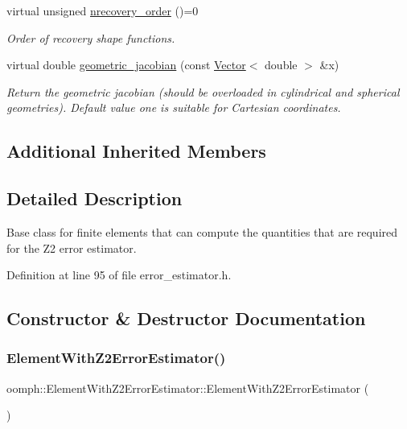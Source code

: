 \begin{DoxyCompactItemize}
virtual unsigned \hyperlink{classoomph_1_1ElementWithZ2ErrorEstimator_af39480835bd3e0f6b2f4f7a9a4044798}{nrecovery\+\_\+order} ()=0
\begin{DoxyCompactList}\small\item\em Order of recovery shape functions. \end{DoxyCompactList}\item 
virtual double \hyperlink{classoomph_1_1ElementWithZ2ErrorEstimator_ad2add457436f34d0d4b9e48900be309c}{geometric\+\_\+jacobian} (const \hyperlink{classoomph_1_1Vector}{Vector}$<$ double $>$ \&x)
\begin{DoxyCompactList}\small\item\em Return the geometric jacobian (should be overloaded in cylindrical and spherical geometries). Default value one is suitable for Cartesian coordinates. \end{DoxyCompactList}\end{DoxyCompactItemize}
\subsection*{Additional Inherited Members}


\subsection{Detailed Description}
Base class for finite elements that can compute the quantities that are required for the Z2 error estimator. 

Definition at line 95 of file error\+\_\+estimator.\+h.



\subsection{Constructor \& Destructor Documentation}
\mbox{\label{classoomph_1_1ElementWithZ2ErrorEstimator_a53cec50800c0bdcd18bfc7b611d23d22}} 
\subsubsection{\texorpdfstring{Element\+With\+Z2\+Error\+Estimator()}{ElementWithZ2ErrorEstimator()}\hspace{0.1cm}{\footnotesize\ttfamily [1/2]}}
{\footnotesize\ttfamily oomph\+::\+Element\+With\+Z2\+Error\+Estimator\+::\+Element\+With\+Z2\+Error\+Estimator (\begin{DoxyParamCaption}{ }\end{DoxyParamCaption})\hspace{0.3cm}{\ttfamily [inline]}}



